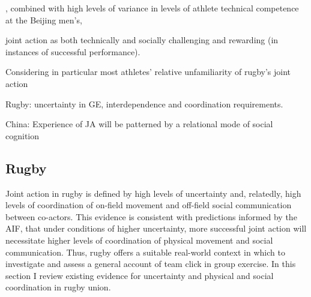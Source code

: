 \begin{CJK}{UTF8}{gbsn}
, combined with high levels of variance in levels of athlete technical competence at the Beijing men's,

joint action as both technically and socially challenging and rewarding (in instances of successful performance).


Considering in particular most athletes' relative unfamiliarity of rugby's joint action


 Rugby: uncertainty in GE, interdependence and coordination requirements.

China: Experience of JA will be patterned by a relational mode of social cognition






\subsection{Rugby\label{sect:rugbyUnion}}

Joint action in rugby is defined by high levels of uncertainty and, relatedly, high levels of coordination of on-field movement and off-field social communication between co-actors.  This evidence is consistent with predictions informed by the AIF, that under conditions of higher uncertainty, more successful joint action will necessitate higher levels of coordination of physical movement and social communication.  Thus, rugby offers a suitable real-world context in which to investigate and assess a general account of team click in group exercise.  In this section I review existing evidence for uncertainty and physical and social coordination in rugby union.


\end{CJK}
